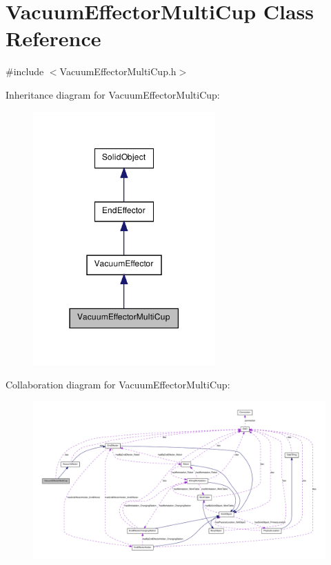 \hypertarget{class_vacuum_effector_multi_cup}{
\section{VacuumEffectorMultiCup Class Reference}
\label{class_vacuum_effector_multi_cup}
}


{\ttfamily \#include $<$VacuumEffectorMultiCup.h$>$}



Inheritance diagram for VacuumEffectorMultiCup:\nopagebreak
\begin{figure}[H]
\begin{center}
\leavevmode
\includegraphics[width=198pt]{class_vacuum_effector_multi_cup__inherit__graph}
\end{center}
\end{figure}


Collaboration diagram for VacuumEffectorMultiCup:\nopagebreak
\begin{figure}[H]
\begin{center}
\leavevmode
\includegraphics[width=400pt]{class_vacuum_effector_multi_cup__coll__graph}
\end{center}
\end{figure}
